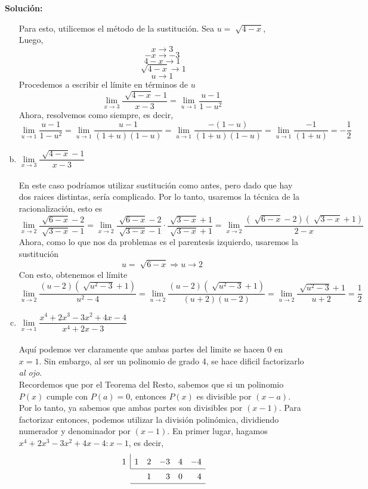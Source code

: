 \documentclass[12pt]{article}
\newenvironment{solucion}
{\begin{mdframed}[backgroundcolor=black!10]
		{\bf Solución:}\\
	}
	{
	\end{mdframed}
}
\newenvironment{preguntas}
{\begin{enumerate}\itemsep12pt
	}
	{
	\end{enumerate}
}
\newcommand{\ra}{\rightarrow}
\begin{document}
\begin{preguntas}
\begin{solucion}
\begin{enumerate}[a)]
Para esto, utilicemos el método de la sustitución. Sea $u = \sqrt[]{4-x}$,\\
Luego,
$$x \ra 3$$
$$-x \ra -3$$
$$4-x \ra 1$$
$$\sqrt[]{4-x} \ra 1$$
$$u \ra 1$$
Procedemos a escribir el límite en términos de $u$
$$\lim\limits_{x \ra 3} \dfrac{\sqrt[]{4-x}-1}{x-3}
= \lim\limits_{u \ra 1} \dfrac{u-1}{1-u^2} $$
Ahora, resolvemos como siempre, es decir,
$$\lim\limits_{u \ra 1} \dfrac{u-1}{1-u^2} 
= \lim\limits_{u \ra 1} \dfrac{u-1}{(1+u)(1-u)}
= \lim\limits_{u \ra 1} \dfrac{-(1-u)}{(1+u)(1-u)}
= \lim\limits_{u \ra 1} \dfrac{-1}{(1+u)}
= -\dfrac{1}{2}$$
\item $\lim\limits_{x \ra 3} \dfrac{\sqrt[]{4-x}-1}{x-3}$\\
\\
En este caso podríamos utilizar sustitución como antes, pero dado que hay dos raices distintas, sería complicado. Por lo tanto, usaremos la técnica de la racionalización, esto es
$$\lim\limits_{x \ra 2} \dfrac{\sqrt[]{6-x}-2}{\sqrt[]{3-x}-1}
=\lim\limits_{x \ra 2} \dfrac{\sqrt[]{6-x}-2}{\sqrt[]{3-x}-1} \cdot \dfrac{\sqrt[]{3-x}+1}{\sqrt[]{3-x}+1} 
=\lim\limits_{x \ra 2} \dfrac{(\sqrt[]{6-x}-2)(\sqrt[]{3-x}+1)}{2-x} $$
Ahora, como lo que nos da problemas es el parentesis izquierdo, usaremos la sustitución
$$u = \sqrt[]{6-x} \Longrightarrow u \ra 2$$
Con esto, obtenemos el límite
$$\lim\limits_{u \ra 2} \dfrac{(u-2)(\sqrt[]{u^2-3}+1)}{u^2-4} 
=\lim\limits_{u \ra 2} \dfrac{(u-2)(\sqrt[]{u^2-3}+1)}{(u+2)(u-2)} 
=\lim\limits_{u \ra 2} \dfrac{\sqrt[]{u^2-3}+1}{u+2}
=\dfrac{1}{2}$$
\item $\lim\limits_{x \ra 1} \dfrac{x^4+2x^3-3x^2+4x-4}{x^4+2x-3}$\\
\\
Aquí podemos ver claramente que ambas partes del limite se hacen 0 en $x=1$. Sin embargo, al ser un polinomio de grado 4, se hace dificil factorizarlo \textit{al ojo}.\\
Recordemos que por el Teorema del Resto, sabemos que si un polinomio $P(x)$ cumple con $P(a) = 0$, entonces $P(x)$ es divisible por $(x-a)$. Por lo tanto, ya sabemos que ambas partes son divisibles por $(x-1)$. Para factorizar entonces, podemos utilizar la división polinómica, dividiendo numerador y denominador por $(x-1)$.
En primer lugar, hagamos $x^4+2x^3-3x^2+4x-4 : x-1$, es decir,
\[
\renewcommand\arraystretch{1.5}
\setlength\doublerulesep{0pt}
\begin{array}{rrrrrr}
\multicolumn{1}{r|}{1} & 1 & 2 & -3 & 4 & -4\\\cline{2-6}
& & 1& 3 & 0 & 4\\\cline{2-6}

\end{array}\]
\end{enumerate}
\end{solucion}
\end{preguntas}
\end{document}
